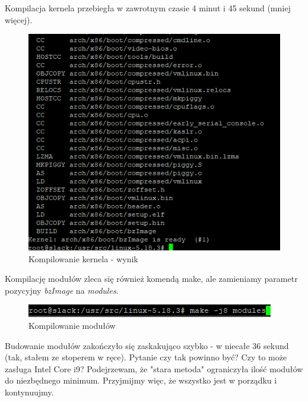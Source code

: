 \documentclass[a4paper,12pt,oneside]{book} %
\begin{document}
Kompilacja kernela przebiegła w zawrotnym czasie 4 minut i 45 sekund (mniej więcej).

\begin{figure}[h]
	\centering
	\includegraphics[scale=0.6]{09-compilation}
	\caption{Kompilowanie kernela - wynik}
	\label{compilation}
\end{figure}

Kompilację modułów zleca się również komendą make, ale zamieniamy parametr pozycyjny \emph{bzImage} na \emph{modules}.

\begin{figure}[h]
	\centering
	\includegraphics[scale=0.6]{10-modules}
	\caption{Kompilowanie modułów}
	\label{modules}
\end{figure}

Budowanie modułów zakończyło się zaskakująco szybko - w niecałe 36 sekund (tak, stałem ze stoperem w ręce). Pytanie czy tak powinno być? Czy to może zasługa Intel Core i9? Podejrzewam, że "stara metoda" ograniczyła ilość modułów do niezbędnego minimum. Przyjmijmy więc, że wszystko jest w porządku i kontynuujmy.
\end{document}

